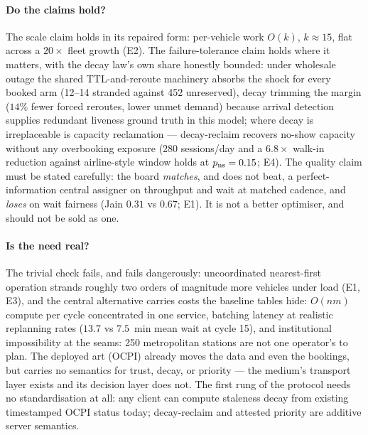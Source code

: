 \documentclass[twoside,twocolumn,usenatbib]{mnras}
\begin{document}
\paragraph{Do the claims hold?}  The scale claim holds in its
repaired form: per-vehicle work $O(k)$, $k\approx15$, flat across a
$20\times$ fleet growth (E2).  The failure-tolerance claim holds
where it matters, with the decay law's own share honestly bounded:
under wholesale outage the shared TTL-and-reroute machinery absorbs
the shock for every booked arm (12--14 stranded against 452
unreserved), decay trimming the margin ($14\%$ fewer forced reroutes,
lower unmet demand) because arrival detection supplies redundant
liveness ground truth in this model; where decay is irreplaceable is
capacity reclamation --- decay-reclaim recovers no-show capacity
without any overbooking exposure ($280$ sessions/day and a
$6.8\times$ walk-in reduction against airline-style window holds
at $p_{\rm ns}=0.15$; E4).
The quality claim must be stated carefully: the board \emph{matches},
and does not beat, a perfect-information central assigner on
throughput and wait at matched cadence, and \emph{loses} on wait
fairness (Jain $0.31$ vs $0.67$; E1).  It is not a better
optimiser, and should not be sold as one.

\paragraph{Is the need real?}  The trivial check fails, and fails
dangerously: uncoordinated nearest-first operation strands roughly
two orders of magnitude more vehicles under load (E1, E3), and the
central alternative carries costs the baseline tables hide:
$O(nm)$ compute per cycle concentrated in one service, batching
latency at realistic replanning rates ($13.7$ vs $7.5$~min mean
wait at cycle 15), and institutional impossibility at the seams:
250 metropolitan stations are not one operator's to plan.  The
deployed art (OCPI) already moves the data and even the bookings,
but carries no semantics for trust, decay, or priority --- the
medium's transport layer exists and its decision layer does not.
The first rung of the protocol needs no standardisation at
all: any client can compute staleness decay from existing
timestamped OCPI status today; decay-reclaim and attested priority
are additive server semantics.
\end{document}
